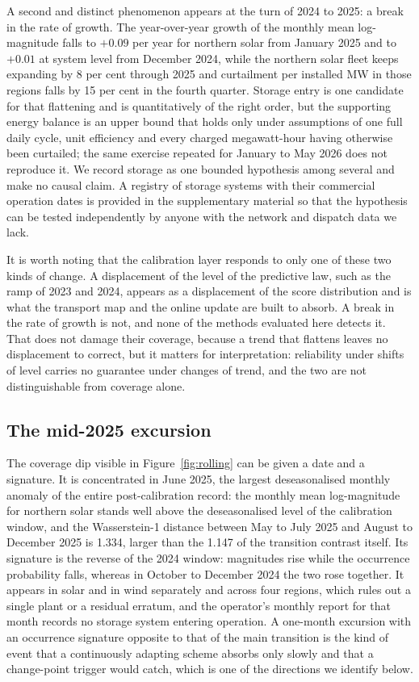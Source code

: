 \documentclass[preprint,3p,times]{elsarticle}
\begin{document}
A second and distinct phenomenon appears at the turn of 2024 to 2025: a break in the rate of growth. The year-over-year growth of the monthly mean log-magnitude falls to $+0.09$ per year for northern solar from January 2025 and to $+0.01$ at system level from December 2024, while the northern solar fleet keeps expanding by 8 per cent through 2025 and curtailment per installed MW in those regions falls by 15 per cent in the fourth quarter. Storage entry is one candidate for that flattening and is quantitatively of the right order, but the supporting energy balance is an upper bound that holds only under assumptions of one full daily cycle, unit efficiency and every charged megawatt-hour having otherwise been curtailed; the same exercise repeated for January to May 2026 does not reproduce it. We record storage as one bounded hypothesis among several and make no causal claim. A registry of storage systems with their commercial operation dates is provided in the supplementary material so that the hypothesis can be tested independently by anyone with the network and dispatch data we lack.

It is worth noting that the calibration layer responds to only one of these two kinds of change. A displacement of the level of the predictive law, such as the ramp of 2023 and 2024, appears as a displacement of the score distribution and is what the transport map and the online update are built to absorb. A break in the rate of growth is not, and none of the methods evaluated here detects it. That does not damage their coverage, because a trend that flattens leaves no displacement to correct, but it matters for interpretation: reliability under shifts of level carries no guarantee under changes of trend, and the two are not distinguishable from coverage alone.

\subsection{The mid-2025 excursion}

The coverage dip visible in Figure~\ref{fig:rolling} can be given a date and a signature. It is concentrated in June 2025, the largest deseasonalised monthly anomaly of the entire post-calibration record: the monthly mean log-magnitude for northern solar stands well above the deseasonalised level of the calibration window, and the Wasserstein-1 distance between May to July 2025 and August to December 2025 is 1.334, larger than the 1.147 of the transition contrast itself. Its signature is the reverse of the 2024 window: magnitudes rise while the occurrence probability falls, whereas in October to December 2024 the two rose together. It appears in solar and in wind separately and across four regions, which rules out a single plant or a residual erratum, and the operator's monthly report for that month records no storage system entering operation. A one-month excursion with an occurrence signature opposite to that of the main transition is the kind of event that a continuously adapting scheme absorbs only slowly and that a change-point trigger would catch, which is one of the directions we identify below.
\end{document}
